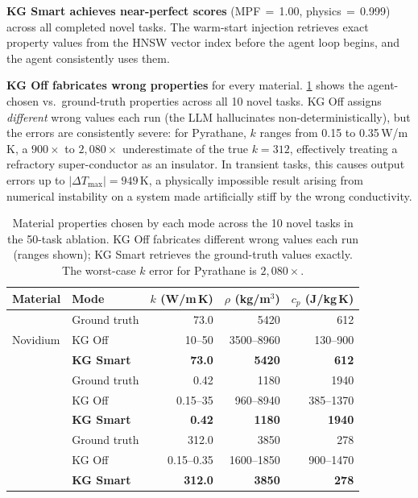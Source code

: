 \documentclass[preprint,review,12pt]{elsarticle}
\begin{document}
\textbf{KG Smart achieves near-perfect scores} (MPF$\,{=}\,$1.00,
physics$\,{=}\,$0.999) across all completed novel tasks.  The warm-start
injection retrieves exact property values from the HNSW vector index
before the agent loop begins, and the agent consistently uses them.

\textbf{KG Off fabricates wrong properties} for every material.
\cref{tab:novel-props} shows the agent-chosen vs.\ ground-truth
properties across all 10 novel tasks.  KG Off assigns \emph{different}
wrong values each run (the LLM hallucinates non-deterministically), but
the errors are consistently severe: for Pyrathane, $k$ ranges from
0.15 to 0.35\,W/m\,K, a $900{\times}$ to $2{,}080{\times}$ underestimate
of the true $k{=}312$, effectively treating a refractory super-conductor
as an insulator.  In transient tasks, this causes output errors up to
$|\Delta T_{\max}|{=}949$\,K, a physically impossible result arising
from numerical instability on a system made artificially stiff by the
wrong conductivity.

\begin{table}[htbp]
\centering\footnotesize
\caption{Material properties chosen by each mode across the 10 novel tasks
  in the 50-task ablation.  KG Off fabricates different wrong values each
  run (ranges shown); KG Smart retrieves the ground-truth values exactly.
  The worst-case $k$ error for Pyrathane is $2{,}080\times$.}
\label{tab:novel-props}
\setlength{\tabcolsep}{3pt}
\begin{tabular}{llrrr}
\toprule
Material & Mode & $k$ (W/m\,K) & $\rho$ (kg/m$^3$) & $c_p$ (J/kg\,K) \\
\midrule
\multirow{3}{*}{Novidium}
  & Ground truth & 73.0 & 5420 & 612 \\
  & KG Off  & 10--50  & 3500--8960 & 130--900 \\
  & \textbf{KG Smart} & \textbf{73.0} & \textbf{5420} & \textbf{612} \\
\addlinespace
\multirow{3}{*}{Cryonite}
  & Ground truth & 0.42 & 1180 & 1940 \\
  & KG Off  & 0.15--35 & 960--8940 & 385--1370 \\
  & \textbf{KG Smart} & \textbf{0.42} & \textbf{1180} & \textbf{1940} \\
\addlinespace
\multirow{3}{*}{Pyrathane}
  & Ground truth & 312.0 & 3850 & 278 \\
  & KG Off  & 0.15--0.35  & 1600--1850 & 900--1470 \\
  & \textbf{KG Smart} & \textbf{312.0} & \textbf{3850} & \textbf{278} \\
\bottomrule
\end{tabular}
\end{table}
\end{document}
